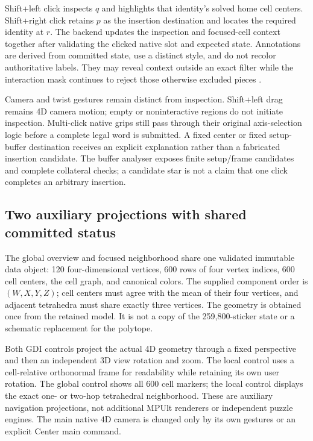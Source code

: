 \documentclass[a4paper,11pt]{article}
\begin{document}
Shift+left click inspects \(q\) and highlights that identity's solved home cell centers. Shift+right click retains \(p\) as the insertion destination and locates the required identity at \(r\). The backend updates the inspection and focused-cell context together after validating the clicked native slot and expected state. Annotations are derived from committed state, use a distinct style, and do not recolor authoritative labels. They may reveal context outside an exact filter while the interaction mask continues to reject those otherwise excluded pieces \cite{structure03}.

Camera and twist gestures remain distinct from inspection. Shift+left drag remains 4D camera motion; empty or noninteractive regions do not initiate inspection. Multi-click native grips still pass through their original axis-selection logic before a complete legal word is submitted. A fixed center or fixed setup-buffer destination receives an explicit explanation rather than a fabricated insertion candidate. The buffer analyser exposes finite setup/frame candidates and complete collateral checks; a candidate star is not a claim that one click completes an arbitrary insertion.

\subsection{Two auxiliary projections with shared committed status}

The global overview and focused neighborhood share one validated immutable data object: 120 four-dimensional vertices, 600 rows of four vertex indices, 600 cell centers, the cell graph, and canonical colors. The supplied component order is \((W,X,Y,Z)\); cell centers must agree with the mean of their four vertices, and adjacent tetrahedra must share exactly three vertices. The geometry is obtained once from the retained model. It is not a copy of the 259,800-sticker state or a schematic replacement for the polytope.

Both GDI controls project the actual 4D geometry through a fixed perspective and then an independent 3D view rotation and zoom. The local control uses a cell-relative orthonormal frame for readability while retaining its own user rotation. The global control shows all 600 cell markers; the local control displays the exact one- or two-hop tetrahedral neighborhood. These are auxiliary navigation projections, not additional MPUlt renderers or independent puzzle engines. The main native 4D camera is changed only by its own gestures or an explicit Center main command.
\end{document}
